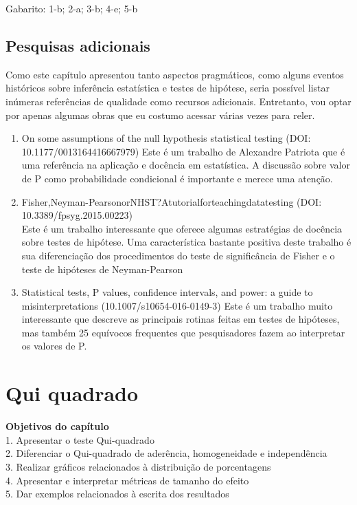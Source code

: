\documentclass[
]{book}
\begin{document}
\begin{mirror}

Gabarito: 1-b; 2-a; 3-b; 4-e; 5-b

\end{mirror}

\hypertarget{pesquisas-adicionais}{%
\section{Pesquisas adicionais}\label{pesquisas-adicionais}}

Como este capítulo apresentou tanto aspectos pragmáticos, como alguns
eventos históricos sobre inferência estatística e testes de hipótese,
seria possível listar inúmeras referências de qualidade como recursos
adicionais. Entretanto, vou optar por apenas algumas obras que eu
costumo acessar várias vezes para reler.

\begin{enumerate}
\def\labelenumi{\arabic{enumi}.}
\item
  On some assumptions of the null hypothesis statistical testing (DOI:
  10.1177/0013164416667979) Este é um trabalho de Alexandre Patriota que
  é uma referência na aplicação e docência em estatística. A discussão
  sobre valor de P como probabilidade condicional é importante e merece
  uma atenção.
\item
  Fisher,Neyman-PearsonorNHST?Atutorialforteachingdatatesting (DOI:
  10.3389/fpsyg.2015.00223)\\
  Este é um trabalho interessante que oferece algumas estratégias de
  docência sobre testes de hipótese. Uma característica bastante
  positiva deste trabalho é sua diferenciação dos procedimentos do teste
  de significância de Fisher e o teste de hipóteses de Neyman-Pearson
\item
  Statistical tests, P values, confidence intervals, and power: a guide
  to misinterpretations (10.1007/s10654-016-0149-3) Este é um trabalho
  muito interessante que descreve as principais rotinas feitas em testes
  de hipóteses, mas também 25 equívocos frequentes que pesquisadores
  fazem ao interpretar os valores de P.
\end{enumerate}

\hypertarget{qui-quadrado}{%
\chapter{Qui quadrado}\label{qui-quadrado}}

\begin{objectives}
\textbf{Objetivos do capítulo}\\
1. Apresentar o teste Qui-quadrado\\
2. Diferenciar o Qui-quadrado de aderência, homogeneidade e
independência\\
3. Realizar gráficos relacionados à distribuição de porcentagens\\
4. Apresentar e interpretar métricas de tamanho do efeito\\
5. Dar exemplos relacionados à escrita dos resultados
\end{objectives}
\end{document}
